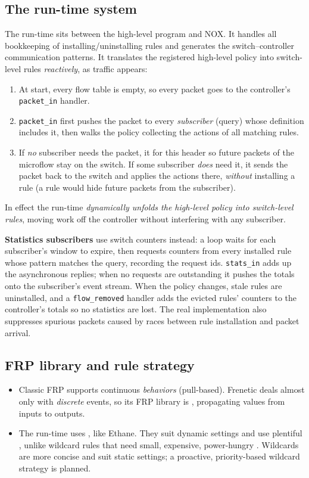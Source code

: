 \subsection{The run-time system}
The run-time sits between the high-level program and NOX. It handles all bookkeeping of installing/uninstalling rules and generates the switch--controller communication patterns. It translates the registered high-level policy into switch-level rules \emph{reactively}, as traffic appears:
\begin{enumerate}
\item At start, every flow table is empty, so every packet goes to the controller's \texttt{packet\_in} handler.
\item \texttt{packet\_in} first pushes the packet to every \emph{subscriber} (query) whose definition includes it, then walks the policy collecting the actions of all matching rules.
\item If \emph{no} subscriber needs the packet, it  for this header so future packets of the microflow stay on the switch. If some subscriber \emph{does} need it, it sends the packet back to the switch and applies the actions there, \emph{without} installing a rule (a rule would hide future packets from the subscriber).
\end{enumerate}
In effect the run-time \emph{dynamically unfolds the high-level policy into switch-level rules}, moving work off the controller without interfering with any subscriber.

\textbf{Statistics subscribers} use switch counters instead: a loop waits for each subscriber's window to expire, then requests counters from every installed rule whose pattern matches the query, recording the request ids. \texttt{stats\_in} adds up the asynchronous replies; when no requests are outstanding it pushes the totals onto the subscriber's event stream. When the policy changes, stale rules are uninstalled, and a \texttt{flow\_removed} handler adds the evicted rules' counters to the controller's totals so no statistics are lost. The real implementation also suppresses spurious packets caused by races between rule installation and packet arrival.

\subsection{FRP library and rule strategy}
\begin{itemize}
\item Classic FRP supports continuous \emph{behaviors} (pull-based). Frenetic deals almost only with \emph{discrete} events, so its FRP library is , propagating values from inputs to outputs.
\item The run-time uses , like Ethane. They suit dynamic settings and use plentiful , unlike wildcard rules that need small, expensive, power-hungry . Wildcards are more concise and suit static settings; a proactive, priority-based wildcard strategy is planned.
\end{itemize}


